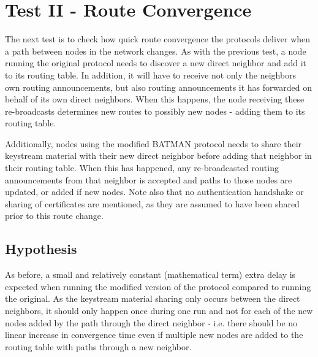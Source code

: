 \section{Test II - Route Convergence}
The next test is to check how quick route convergence the protocols deliver when
a path between nodes in the network changes. As with the previous test, a
node running the original protocol needs to discover a new direct neighbor and
add it to its routing table. In addition, it will have to receive not only the
neighbors own routing announcements, but also routing announcements it has
forwarded on behalf of its own direct neighbors. When this happens, the node
receiving these re-broadcasts determines new routes to possibly new nodes -
adding them to its routing table.

Additionally, nodes using the modified BATMAN protocol needs to share
their keystream material with their new direct neighbor before adding that
neighbor in their routing table. When this has happened, any re-broadcasted
routing announcements from that neighbor is accepted and paths to those nodes
are updated, or added if new nodes. Note also that no authentication handshake
or sharing of certificates are mentioned, as they are assumed to have been
shared prior to this route change.

\subsection{Hypothesis}
As before, a small and relatively constant (mathematical term) extra delay is
expected when running the modified version of the protocol compared to running
the original. As the keystream material sharing only occurs between the direct
neighbors, it should only happen once during one run and not for each of the new
nodes added by the path through the direct neighbor - i.e. there should be no
linear increase in convergence time even if multiple new nodes are added to the
routing table with paths through a new neighbor.

